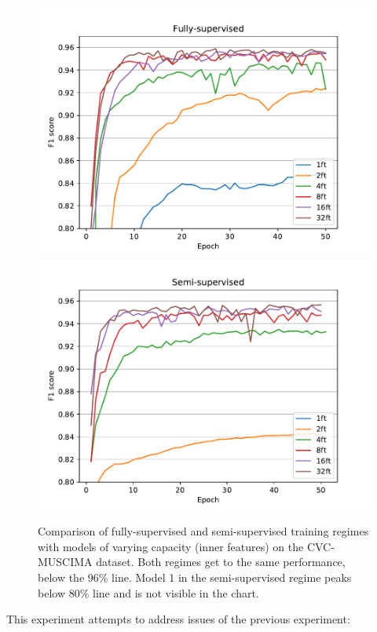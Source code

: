 \begin{figure}[p]
    \centering
    \includegraphics[width=140mm]{../../figures/02-cvc-improvements/supervised.pdf}
    \includegraphics[width=140mm]{../../figures/02-cvc-improvements/semisupervised.pdf}
    \caption{Comparison of fully-supervised and semi-supervised training regimes with models of varying capacity (inner features) on the CVC-MUSCIMA dataset. Both regimes get to the same performance, below the 96\% line. Model 1 in the semi-supervised regime peaks below 80\% line and is not visible in the chart.}
    \label{fig:CvcImprovements}
\end{figure}

This experiment attempts to address issues of the previous experiment:

